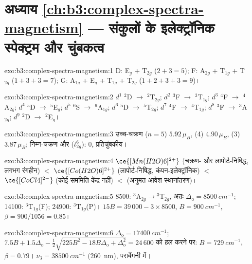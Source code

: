 \section*{अध्याय \ref{ch:b3:complex-spectra-magnetism} --- संकुलों के इलेक्ट्रॉनिक स्पेक्ट्रम और चुंबकत्व}

\begin{solution}{exo:b3:complex-spectra-magnetism:1}
D: E$_g$ + T$_{2g}$ ($2 + 3 = 5$); F: A$_{2g}$ + T$_{1g}$ + T$_{2g}$ ($1 + 3 + 3 = 7$); G: A$_{1g}$ + E$_g$ + T$_{1g}$ + T$_{2g}$
($1 + 2 + 3 + 3 = 9$)।
\end{solution}

\begin{solution}{exo:b3:complex-spectra-magnetism:2}
$d^1$ $^2$D $\to$ $^2$T$_{2g}$; $d^2$ $^3$F $\to$ $^3$T$_{1g}$; $d^3$ $^4$F $\to$ $^4$A$_{2g}$; $d^4$ $^5$D $\to$ $^5$E$_g$; $d^5$ $^6$S $\to$ $^6$A$_{1g}$; $d^6$ $^5$D
$\to$ $^5$T$_{2g}$; $d^7$ $^4$F $\to$ $^4$T$_{1g}$; $d^8$ $^3$F $\to$ $^3$A$_{2g}$; $d^9$ $^2$D $\to$ $^2$E$_g$।
\end{solution}

\begin{solution}{exo:b3:complex-spectra-magnetism:3}
उच्च-चक्रण  ($n = 5$) $5.92\,\mu_B$,  (4) $4.90\,\mu_B$,  (3) $3.87\,\mu_B$; निम्न-चक्रण  और
 ($t_{2g}^6$): 0, प्रतिचुंबकीय।
\end{solution}

\begin{solution}{exo:b3:complex-spectra-magnetism:4}
$\ce{[Mn(H2O)6]^{2+}}$ (चक्रण- और लापोर्ट-निषिद्ध, लगभग रंगहीन) $<$ $\ce{[Co(H2O)6]^{2+}}$
(लापोर्ट-निषिद्ध, कंपन-इलेक्ट्रॉनिक) $<$ $\ce{[CoCl4]^{2-}}$ (कोई सममिति केंद्र नहीं) $<$  (अनुमत
आवेश स्थानांतरण)।
\end{solution}

\begin{solution}{exo:b3:complex-spectra-magnetism:5}
8500: $^3$A$_{2g}\to{}^3$T$_{2g}$, अतः $\Delta_{\mathrm o} = \qty{8500}{cm^{-1}}$; 14100: $^3$T$_{1g}$(F); 24900: $^3$T$_{1g}$(P)।
$15B = 39\,000 - 3 \times 8500$, $B = \qty{900}{cm^{-1}}$, $\beta = 900/1056 = 0.85$।
\end{solution}

\begin{solution}{exo:b3:complex-spectra-magnetism:6}
$\Delta_{\mathrm o} = \qty{17400}{cm^{-1}}$; $7.5B + 1.5\Delta_{\mathrm o} - \frac12\sqrt{225B^2 - 18B\Delta_{\mathrm o} + \Delta_{\mathrm o}^2} = 24\,600$ को हल करने पर: $B = \qty{729}{cm^{-1}}$,
$\beta = 0.79$। $\nu_3 = \qty{38500}{cm^{-1}}$ (\qty{260}{nm}), पराबैंगनी में।
\end{solution}

